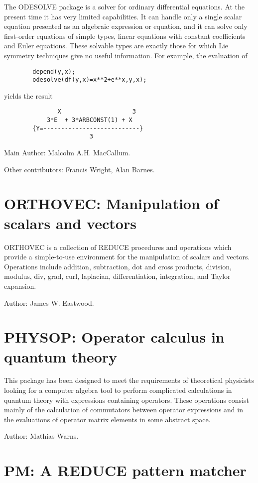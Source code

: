 The ODESOLVE package is a solver for ordinary differential equations.  At
the present time it has very limited capabilities.  It can handle only a
single scalar equation presented as an algebraic expression or equation,
and it can solve only first-order equations of simple types, linear
equations with constant coefficients and Euler equations.  These solvable
types are exactly those for which Lie symmetry techniques give no useful
information.  For example, the evaluation of
\begin{verbatim}
        depend(y,x);
        odesolve(df(y,x)=x**2+e**x,y,x);
\end{verbatim}
yields the result
\begin{verbatim}
               X                    3
            3*E  + 3*ARBCONST(1) + X
        {Y=---------------------------}
                        3
\end{verbatim}

Main Author: Malcolm A.H. MacCallum.

Other contributors: Francis Wright, Alan Barnes.

\section{ORTHOVEC: Manipulation of scalars and vectors}

ORTHOVEC is a collection of REDUCE procedures and operations which
provide a simple-to-use environment for the manipulation of scalars and
vectors.  Operations include addition, subtraction, dot and cross
products, division, modulus, div, grad, curl, laplacian, differentiation,
integration, and Taylor expansion.

Author: James W. Eastwood.

\section{PHYSOP: Operator calculus in quantum theory}

This package has been designed to meet the requirements of theoretical
physicists looking for a computer algebra tool to perform complicated
calculations in quantum theory with expressions containing operators.
These operations consist mainly of the calculation of commutators between
operator expressions and in the evaluations of operator matrix elements in
some abstract space.

Author: Mathias Warns.

\section{PM: A REDUCE pattern matcher} 


